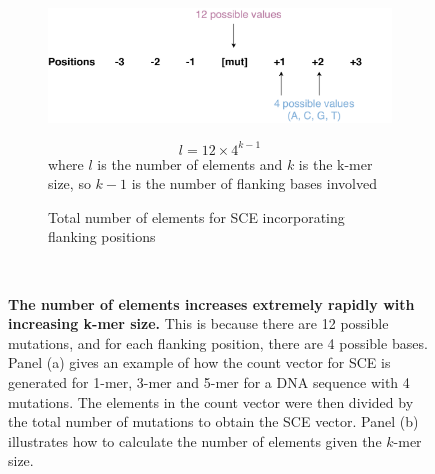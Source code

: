 \begin{figure}[ht!]
  \vspace{0.5cm}
  \begin{subfigure}{\textwidth}
  \begin{minipage}{0.65\textwidth}
    \includegraphics[width=\textwidth]{graphics/sce_counts_demo.pdf}
  \end{minipage}
  \begin{minipage}{0.3\textwidth}
    \begin{equation}
    l = 12 \times 4^{k-1}
    \label{eq:sce_counts}
    \end{equation}
    where $l$ is the number of elements and $k$ is the k-mer size, so $k-1$ is the number of flanking bases involved
  \end{minipage}
    \caption{Total number of elements for SCE incorporating flanking positions}\label{fig:sce_size}
  \end{subfigure} \\
 
  \caption{
  \textbf{The number of elements increases extremely rapidly with increasing k-mer size.} This is because there are 12 possible mutations, and for each flanking position, there are 4 possible bases. Panel (a) gives an example of how the count vector for SCE is generated for 1-mer, 3-mer and 5-mer for a DNA sequence with 4 mutations. The elements in the count vector were then divided by the total number of mutations to obtain the SCE vector. Panel (b) illustrates how to calculate the number of elements given the $k$-mer size. 
} \label{fig:sce_counts}
\end{figure}
